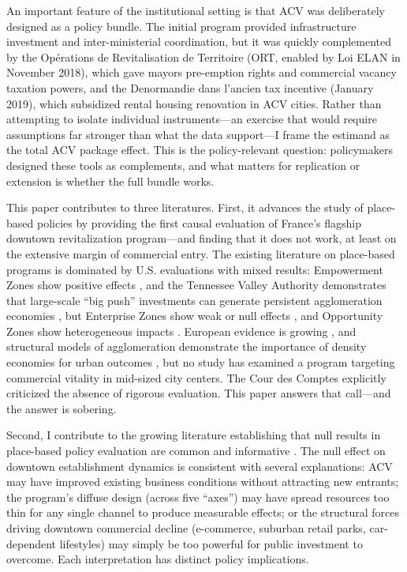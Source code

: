\documentclass[12pt]{article}
\begin{document}
An important feature of the institutional setting is that ACV was deliberately designed as a policy bundle. The initial program provided infrastructure investment and inter-ministerial coordination, but it was quickly complemented by the Op\'erations de Revitalisation de Territoire (ORT, enabled by Loi ELAN in November 2018), which gave mayors pre-emption rights and commercial vacancy taxation powers, and the Denormandie dans l'ancien tax incentive (January 2019), which subsidized rental housing renovation in ACV cities. Rather than attempting to isolate individual instruments---an exercise that would require assumptions far stronger than what the data support---I frame the estimand as the total ACV package effect. This is the policy-relevant question: policymakers designed these tools as complements, and what matters for replication or extension is whether the full bundle works.

This paper contributes to three literatures. First, it advances the study of place-based policies by providing the first causal evaluation of France's flagship downtown revitalization program---and finding that it does not work, at least on the extensive margin of commercial entry. The existing literature on place-based programs is dominated by U.S. evaluations with mixed results: Empowerment Zones show positive effects \citep{busso2013assessing}, and the Tennessee Valley Authority demonstrates that large-scale ``big push'' investments can generate persistent agglomeration economies \citep{kline2014local}, but Enterprise Zones show weak or null effects \citep{neumark2004enterprise, ham2011government}, and Opportunity Zones show heterogeneous impacts \citep{chen2024opportunity, freedman2024place}. European evidence is growing \citep{becker2010going, criscuolo2019some, ehrlich2018place}, and structural models of agglomeration demonstrate the importance of density economies for urban outcomes \citep{ahlfeldt2015economics}, but no study has examined a program targeting commercial vitality in mid-sized city centers. The Cour des Comptes \citeyearpar{courdescomptes2022} explicitly criticized the absence of rigorous evaluation. This paper answers that call---and the answer is sobering.

Second, I contribute to the growing literature establishing that null results in place-based policy evaluation are common and informative \citep{neumark2015place}. The null effect on downtown establishment dynamics is consistent with several explanations: ACV may have improved existing business conditions without attracting new entrants; the program's diffuse design (across five ``axes'') may have spread resources too thin for any single channel to produce measurable effects; or the structural forces driving downtown commercial decline (e-commerce, suburban retail parks, car-dependent lifestyles) may simply be too powerful for public investment to overcome. Each interpretation has distinct policy implications.
\end{document}
